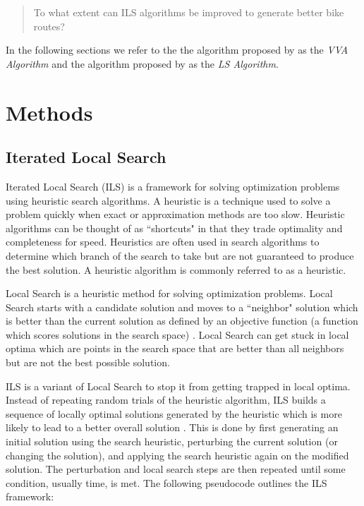 \documentclass[honors]{union-cs-thesis}
\begin{document}
\begin{quote}
    To what extent can ILS algorithms be improved to generate better bike routes?
\end{quote}

In the following sections we refer to the the algorithm proposed by \citeauthor{verbeeck2014extension} as the \emph{VVA Algorithm} and the algorithm proposed by \citeauthor{lu2015arc} as the \emph{LS Algorithm}.


\section{Methods}

\subsection{Iterated Local Search}
Iterated Local Search (ILS) is a framework for solving optimization problems using heuristic search algorithms. A heuristic is a technique used to solve a problem quickly when exact or approximation methods are too slow. Heuristic algorithms can be thought of as ``shortcuts" in that they trade optimality and completeness for speed. Heuristics are often used in search algorithms to  determine which branch of the search to take but are not guaranteed to produce the best solution. A heuristic algorithm is commonly referred to as a heuristic.

Local Search is a heuristic method for solving optimization problems. Local Search starts with a candidate solution and moves to a ``neighbor" solution which is better than the current solution as defined by an objective function (a function which scores solutions in the search space) \cite{gendreau2010handbook}. Local Search can get stuck in local optima which are points in the search space that are better than all neighbors but are not the best possible solution.

ILS is a variant of Local Search to stop it from getting trapped in local optima. Instead of repeating random trials of the heuristic algorithm, ILS builds a sequence of locally optimal solutions generated by the heuristic which is more likely to lead to a better overall solution \cite{gendreau2010handbook}. This is done by first generating an initial solution using the search heuristic, perturbing the current solution (or changing the solution), and applying the search heuristic again on the modified solution. The perturbation and local search steps are then repeated until some condition, usually time, is met.
The following pseudocode outlines the ILS framework:
\end{document}
